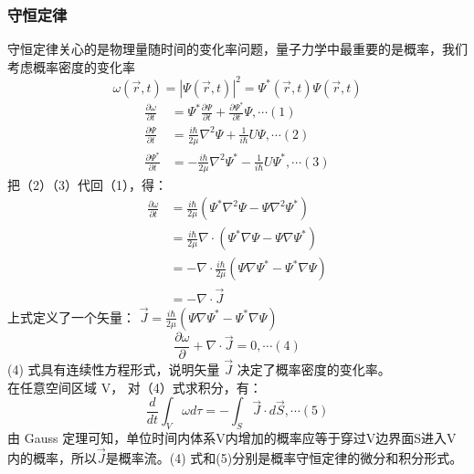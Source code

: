 \begin{frame} [allowframebreaks=]
    \frametitle{守恒定律 }
    守恒定律关心的是物理量随时间的变化率问题，量子力学中最重要的是概率，我们考虑概率密度的变化率
    $$\omega (\vec{r}, t)=|\Psi(\vec{r}, t)|^{2}=\Psi^{*}(\vec{r}, t) \Psi(\vec{r}, t)$$
    \begin{equation*}
        \begin{split}
            \frac{\partial \omega}{\partial t} &=\Psi^{*} \frac{\partial \Psi}{\partial t}+\frac{\partial \Psi^{*}}{\partial t} \Psi, \cdots (1) \\
            \frac{\partial \Psi}{\partial t} & =\frac{i \hbar}{2 \mu} \nabla^{2} \Psi+\frac{1}{i \hbar} U \Psi, \cdots (2) \\
            \frac{\partial \Psi^{*}}{\partial t} & =-\frac{i \hbar}{2 \mu} \nabla^{2} \Psi^{*}-\frac{1}{i \hbar} U \Psi^{*}, \cdots (3) 
        \end{split}
    \end{equation*}
    把（2）（3）代回（1），得：
    \begin{equation*}
        \begin{split}
        \frac{\partial \omega}{\partial t}& =\frac{i \hbar}{2 \mu}\left(\Psi^{*} \nabla^{2} \Psi-\Psi \nabla^{2} \Psi^{*}\right) \\
        &=\frac{i \hbar}{2 \mu} \nabla \cdot\left(\Psi^{*} \nabla \Psi-\Psi \nabla \Psi^{*}\right)\\
        &=-\nabla \cdot \frac{i \hbar}{2 \mu} \left(\Psi \nabla \Psi^{*}-\Psi^{*} \nabla \Psi\right) \\
        &=-\nabla \cdot \vec{J}
        \end{split}
    \end{equation*}
    上式定义了一个矢量： $\vec{J}=\frac{i \hbar}{2 \mu} \left(\Psi \nabla \Psi^{*}-\Psi^{*} \nabla \Psi\right) $ \\
    \begin{equation*}
        \frac{\partial \omega}{\partial}+ \nabla \cdot \vec{J}=0, \cdots (4)
    \end{equation*}    
    (4) 式具有连续性方程形式，说明矢量 $\vec{J}$ 决定了概率密度的变化率。\\
    在任意空间区域 V， 对（4）式求积分，有：
    \begin{equation*}
        \frac{d}{d t} \int_{V} \omega d \tau =-\int_{S} \vec{J} \cdot d \vec{S}, \cdots (5)
    \end{equation*}
    由 Gauss 定理可知，单位时间内体系V内增加的概率应等于穿过V边界面S进入V内的概率，所以$\vec{J}$是概率流。(4) 式和(5)分别是概率守恒定律的微分和积分形式。

\end{frame}
